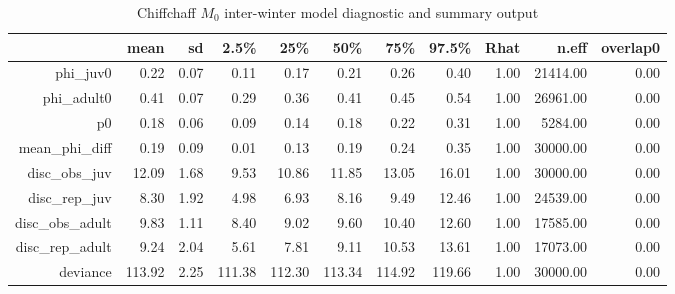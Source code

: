 \begin{table}[ht]
\centering
\begin{tabular}{rrrrrrrrrrr}
  \hline
 & mean & sd & 2.5\% & 25\% & 50\% & 75\% & 97.5\% & Rhat & n.eff & overlap0 \\ 
  \hline
phi\_juv0 & 0.22 & 0.07 & 0.11 & 0.17 & 0.21 & 0.26 & 0.40 & 1.00 & 21414.00 & 0.00 \\ 
  phi\_adult0 & 0.41 & 0.07 & 0.29 & 0.36 & 0.41 & 0.45 & 0.54 & 1.00 & 26961.00 & 0.00 \\ 
  p0 & 0.18 & 0.06 & 0.09 & 0.14 & 0.18 & 0.22 & 0.31 & 1.00 & 5284.00 & 0.00 \\ 
  mean\_phi\_diff & 0.19 & 0.09 & 0.01 & 0.13 & 0.19 & 0.24 & 0.35 & 1.00 & 30000.00 & 0.00 \\ 
  disc\_obs\_juv & 12.09 & 1.68 & 9.53 & 10.86 & 11.85 & 13.05 & 16.01 & 1.00 & 30000.00 & 0.00 \\ 
  disc\_rep\_juv & 8.30 & 1.92 & 4.98 & 6.93 & 8.16 & 9.49 & 12.46 & 1.00 & 24539.00 & 0.00 \\ 
  disc\_obs\_adult & 9.83 & 1.11 & 8.40 & 9.02 & 9.60 & 10.40 & 12.60 & 1.00 & 17585.00 & 0.00 \\ 
  disc\_rep\_adult & 9.24 & 2.04 & 5.61 & 7.81 & 9.11 & 10.53 & 13.61 & 1.00 & 17073.00 & 0.00 \\ 
  deviance & 113.92 & 2.25 & 111.38 & 112.30 & 113.34 & 114.92 & 119.66 & 1.00 & 30000.00 & 0.00 \\ 
   \hline
\end{tabular}
\caption{Chiffchaff $M_0$ inter-winter model diagnostic and summary output} 
\label{tab:chiffchaff_m0_inter_summary_output}
\end{table}
